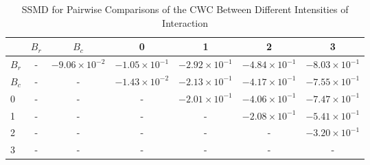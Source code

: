 \begin{table*}[!t]
\caption{SSMD for Pairwise Comparisons of the CWC Between Different Intensities of Interaction\label{tab:ssmd_coherence}}
\centering
\begin{tabular}{lcccccc}
\toprule
 & $B_r$ & $B_c$ & 0 & 1 & 2 & 3 \\
\midrule
$B_r$ & - & $-9.06 \times 10^{-2}$ & $-1.05 \times 10^{-1}$ & $-2.92 \times 10^{-1}$ & $-4.84 \times 10^{-1}$ & $-8.03 \times 10^{-1}$ \\
$B_c$ & - & - & $-1.43 \times 10^{-2}$ & $-2.13 \times 10^{-1}$ & $-4.17 \times 10^{-1}$ & $-7.55 \times 10^{-1}$ \\
0 & - & - & - & $-2.01 \times 10^{-1}$ & $-4.06 \times 10^{-1}$ & $-7.47 \times 10^{-1}$ \\
1 & - & - & - & - & $-2.08 \times 10^{-1}$ & $-5.41 \times 10^{-1}$ \\
2 & - & - & - & - & - & $-3.20 \times 10^{-1}$ \\
3 & - & - & - & - & - & - \\
\bottomrule
\end{tabular}
\end{table*}
